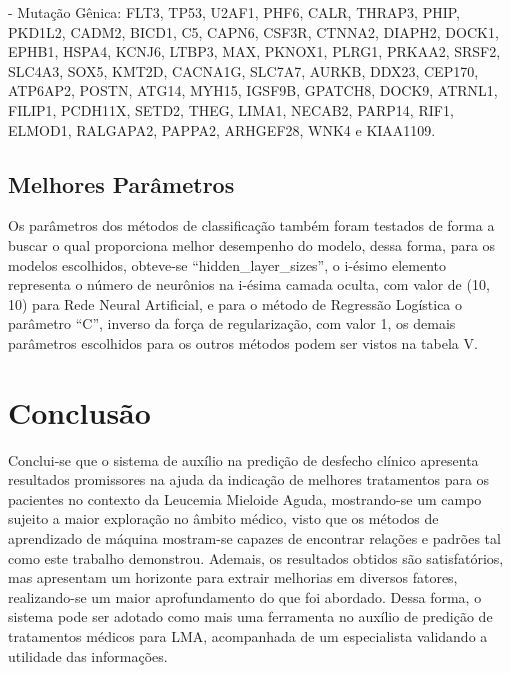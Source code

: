 \documentclass[10pt, conference, compsocconf]{IEEEtran}
\begin{document}
- Mutação Gênica: FLT3, TP53, U2AF1, PHF6, CALR, THRAP3, PHIP, PKD1L2, CADM2, BICD1, C5, CAPN6, CSF3R, CTNNA2, DIAPH2, DOCK1, EPHB1, HSPA4, KCNJ6, LTBP3, MAX, PKNOX1, PLRG1, PRKAA2, SRSF2, SLC4A3, SOX5, KMT2D, CACNA1G, SLC7A7, AURKB, DDX23, CEP170, ATP6AP2, POSTN, ATG14, MYH15, IGSF9B, GPATCH8, DOCK9, ATRNL1, FILIP1, PCDH11X, SETD2, THEG, LIMA1, NECAB2, PARP14, RIF1, ELMOD1, RALGAPA2, PAPPA2, ARHGEF28, WNK4 e KIAA1109.

\subsection{Melhores Parâmetros}
Os parâmetros dos métodos de classificação também foram testados de forma a buscar o qual proporciona melhor desempenho do modelo, dessa forma, para os modelos escolhidos, obteve-se “hidden\_layer\_sizes”, o i-ésimo elemento representa o número de neurônios na i-ésima camada oculta, com valor de (10, 10) para Rede Neural Artificial, e para o método de Regressão Logística o parâmetro “C”,  inverso da força de regularização, com valor 1, os demais parâmetros escolhidos para os outros métodos podem ser vistos na tabela V.

\begin{table}[]
\caption{Melhores Parâmetros para os métodos}
\centering
{}
\end{table}

\section{Conclusão}
Conclui-se que o sistema de auxílio na predição de desfecho clínico apresenta resultados promissores na ajuda da indicação de melhores tratamentos para os pacientes no contexto da Leucemia Mieloide Aguda, mostrando-se um campo sujeito a maior exploração no âmbito médico, visto que os métodos de aprendizado de máquina mostram-se capazes de encontrar relações e padrões tal como este trabalho demonstrou. Ademais, os resultados obtidos são satisfatórios, mas apresentam um horizonte para extrair melhorias em diversos fatores, realizando-se um maior aprofundamento do que foi abordado. Dessa forma, o sistema pode ser adotado como mais uma ferramenta no auxílio de predição de tratamentos médicos para LMA, acompanhada de um especialista validando a utilidade das informações.
\end{document}
